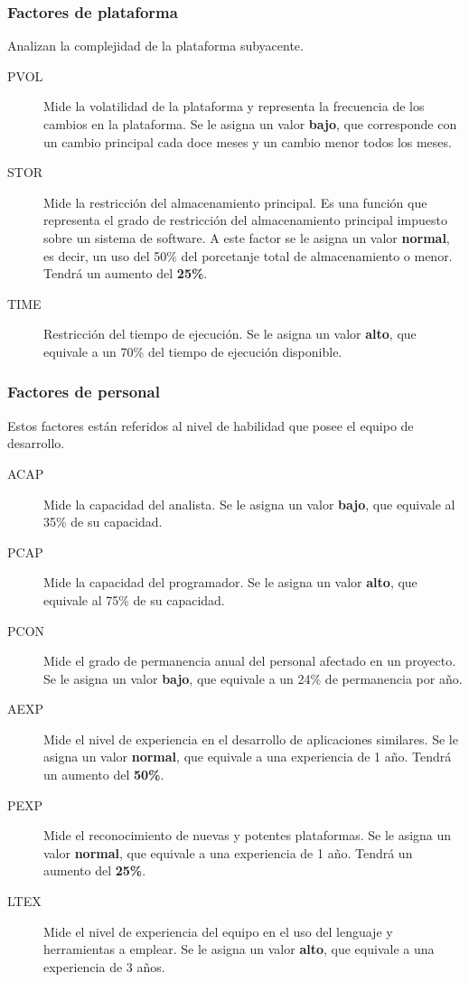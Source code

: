\documentclass[11pt,a4paper,spanish,twoside]{book}
\begin{document}
\subsubsection{Factores de plataforma}
Analizan la complejidad de la plataforma subyacente.
\begin{description}
\item[PVOL] Mide la volatilidad de la plataforma y representa la frecuencia de
  los cambios en la plataforma. Se le asigna un valor \textbf{bajo}, que
  corresponde con un cambio principal cada doce meses y un cambio menor todos
  los meses.

\item[STOR] Mide la restricción del almacenamiento principal. Es una función
  que representa el grado de restricción del almacenamiento principal
  impuesto sobre un sistema de software. A este factor se le asigna un valor
  \textbf{normal}, es decir, un uso del 50\% del porcetanje total de
  almacenamiento o menor. Tendrá un aumento del \textbf{25\%}.

\item[TIME] Restricción del tiempo de ejecución. Se le asigna un valor
  \textbf{alto}, que equivale a un 70\% del tiempo de ejecución disponible.
\end{description}

\subsubsection{Factores de personal}
Estos factores están referidos al nivel de habilidad que posee el equipo de
desarrollo.
\begin{description}
\item[ACAP] Mide la capacidad del analista. Se le asigna un valor
\textbf{bajo}, que equivale al 35\% de su capacidad.
\item[PCAP] Mide la capacidad del programador. Se le asigna un valor
\textbf{alto}, que equivale al 75\% de su capacidad.
\item[PCON] Mide el grado de permanencia anual del personal afectado en un
proyecto. Se le asigna un valor \textbf{bajo}, que equivale a un 24\% de
permanencia por año.
\item[AEXP] Mide el nivel de experiencia en el desarrollo de aplicaciones
similares. Se le asigna un valor \textbf{normal}, que equivale a una
experiencia de 1 año. Tendrá un aumento del \textbf{50\%}.
\item[PEXP] Mide el reconocimiento de nuevas y potentes plataformas. Se le
asigna un valor \textbf{normal}, que equivale a una experiencia de 1
año. Tendrá un aumento del \textbf{25\%}. 
\item[LTEX] Mide el nivel de experiencia del equipo en el uso del lenguaje y
herramientas a emplear. Se le asigna un valor \textbf{alto}, que equivale a una
experiencia de 3 años.
\end{description}
\end{document}
